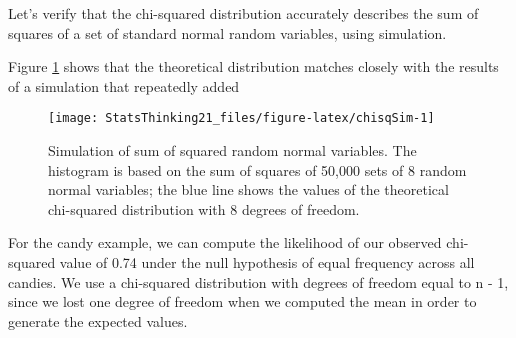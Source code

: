 \documentclass[]{book}
\newenvironment{Shaded}{\begin{snugshade}}{\end{snugshade}}
\newcommand{\KeywordTok}[1]{\textcolor[rgb]{0.13,0.29,0.53}{\textbf{#1}}}
\newcommand{\DataTypeTok}[1]{\textcolor[rgb]{0.13,0.29,0.53}{#1}}
\newcommand{\DecValTok}[1]{\textcolor[rgb]{0.00,0.00,0.81}{#1}}
\newcommand{\FloatTok}[1]{\textcolor[rgb]{0.00,0.00,0.81}{#1}}
\newcommand{\StringTok}[1]{\textcolor[rgb]{0.31,0.60,0.02}{#1}}
\newcommand{\CommentTok}[1]{\textcolor[rgb]{0.56,0.35,0.01}{\textit{#1}}}
\newcommand{\OtherTok}[1]{\textcolor[rgb]{0.56,0.35,0.01}{#1}}
\newcommand{\OperatorTok}[1]{\textcolor[rgb]{0.81,0.36,0.00}{\textbf{#1}}}
\newcommand{\NormalTok}[1]{#1}
\theoremstyle{definition}
\theoremstyle{definition}
\theoremstyle{definition}
\theoremstyle{remark}
\begin{document}
Let's verify that the chi-squared distribution accurately describes the
sum of squares of a set of standard normal random variables, using
simulation.

\begin{Shaded}
\end{Shaded}

Figure \ref{fig:chisqSim} shows that the theoretical distribution
matches closely with the results of a simulation that repeatedly added

\begin{figure}
\texttt{[image: StatsThinking21\_files/figure-latex/chisqSim-1]} \caption{Simulation of sum of squared random normal variables.   The histogram is based on the sum of squares of 50,000 sets of 8 random normal variables; the blue line shows the values of the theoretical chi-squared distribution with 8 degrees of freedom.}\label{fig:chisqSim}
\end{figure}

For the candy example, we can compute the likelihood of our observed
chi-squared value of 0.74 under the null hypothesis of equal frequency
across all candies. We use a chi-squared distribution with degrees of
freedom equal to n - 1, since we lost one degree of freedom when we
computed the mean in order to generate the expected values.

\begin{Shaded}
\end{Shaded}
\end{document}
